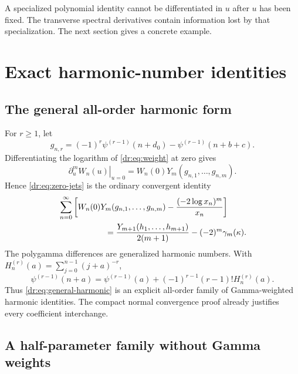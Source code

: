 \documentclass[11pt,letterpaper]{article}
\numberwithin{equation}{section}
\theoremstyle{definition}
\theoremstyle{remark}
\begin{document}
A specialized polynomial identity cannot be differentiated in $u$ after
$u$ has been fixed. The transverse spectral derivatives contain information
lost by that specialization. The next section gives a concrete example.

\section{Exact harmonic-number identities}
\label{dr:sec:harmonic}

\subsection{The general all-order harmonic form}

For $r\geq1$, let
\begin{equation}
 g_{n,r}=(-1)^r\psi^{(r-1)}(n+d_0)
                   -\psi^{(r-1)}(n+b+c).
 \label{dr:eq:g}
\end{equation}
Differentiating the logarithm of \eqref{dr:eq:weight} at zero gives
\begin{equation}
 \left.\partial_u^mW_n(u)\right|_{u=0}
   =W_n(0)Y_m(g_{n,1},\ldots,g_{n,m}).
 \label{dr:eq:W-Bell}
\end{equation}
Hence \eqref{dr:eq:zero-jets} is the ordinary convergent identity
\begin{align}
 &\sum_{n=0}^{\infty}
 \left[W_n(0)Y_m(g_{n,1},\ldots,g_{n,m})
               -\frac{(-2\log x_n)^m}{x_n}\right]\notag\\
 &\hspace{20mm}=
 \frac{Y_{m+1}(h_1,\ldots,h_{m+1})}{2(m+1)}
                  -(-2)^m\gamma_m(\kappa).
 \label{dr:eq:general-harmonic}
\end{align}
The polygamma differences are generalized harmonic numbers. With
$H_n^{(r)}(a)=\sum_{j=0}^{n-1}(j+a)^{-r}$,
\begin{equation}
 \psi^{(r-1)}(n+a)=\psi^{(r-1)}(a)
                  +(-1)^{r-1}(r-1)!H_n^{(r)}(a).
 \label{dr:eq:harmonic-conversion}
\end{equation}
Thus \eqref{dr:eq:general-harmonic} is an explicit all-order family of
Gamma-weighted harmonic identities. The compact normal convergence proof
already justifies every coefficient interchange.

\subsection{A half-parameter family without Gamma weights}
\end{document}
